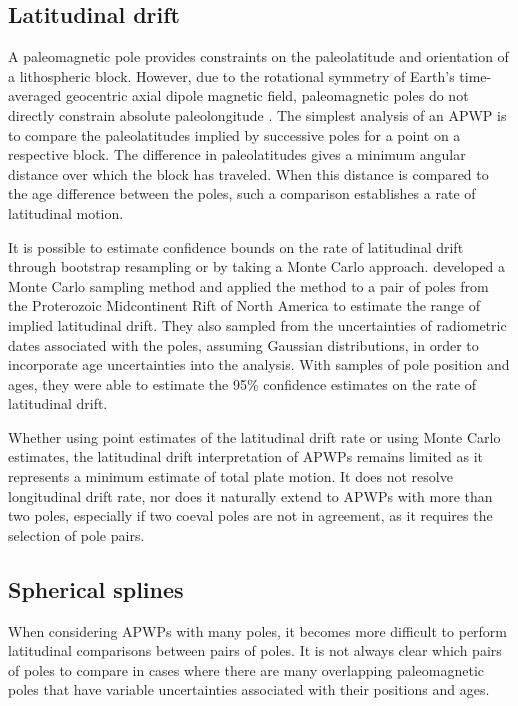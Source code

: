\documentclass[11pt,letterpaper]{article}
\begin{document}
\subsection*{Latitudinal drift}
A paleomagnetic pole provides constraints on the paleolatitude and orientation of a lithospheric block. However, due to the rotational symmetry of Earth's time-averaged geocentric axial dipole magnetic field, paleomagnetic poles do not directly constrain absolute paleolongitude \citep{Butler1992a}. The simplest analysis of an APWP is to compare the paleolatitudes implied by successive poles for a point on a respective block. The difference in paleolatitudes gives a minimum angular distance over which the block has traveled.  When this distance is compared to the age difference between the poles, such a comparison establishes a rate of latitudinal motion.

It is possible to estimate confidence bounds on the rate of latitudinal drift through bootstrap resampling \citep[e.g.][]{Tarduno1990b} or by taking a Monte Carlo approach. \cite{Swanson-Hysell2014b} developed a Monte Carlo sampling method and applied the method to a pair of poles from the Proterozoic Midcontinent Rift of North America to estimate the range of implied latitudinal drift. They also sampled from the uncertainties of radiometric dates associated with the poles, assuming Gaussian distributions, in order to incorporate age uncertainties into the analysis. With samples of pole position and ages, they were able to estimate the 95\% confidence estimates on the rate of latitudinal drift.

Whether using point estimates of the latitudinal drift rate or using Monte Carlo estimates, the latitudinal drift interpretation of APWPs remains limited as it represents a minimum estimate of total plate motion. It does not resolve longitudinal drift rate, nor does it naturally extend to APWPs with more than two poles, especially if two coeval poles are not in agreement, as it requires the selection of pole pairs.

\subsection*{Spherical splines}
When considering APWPs with many poles, it becomes more difficult to perform latitudinal comparisons between pairs of poles. It is not always clear which pairs of poles to compare in cases where there are many overlapping paleomagnetic poles that have variable uncertainties associated with their positions and ages.
\end{document}
